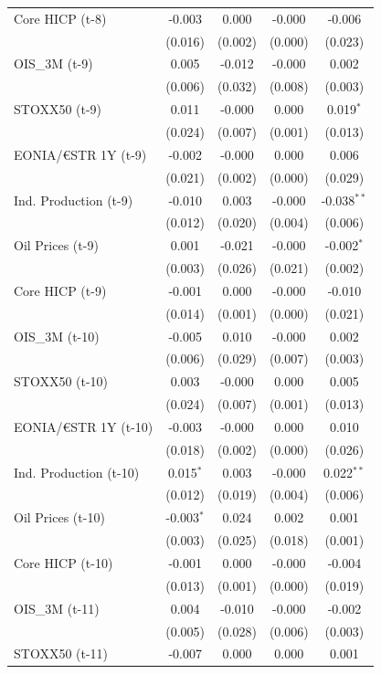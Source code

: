 \begin{longtable}[t]{lcccc}
Core HICP (t-8) & -0.003 & 0.000 & -0.000 & -0.006\\
 & (0.016) & (0.002) & (0.000) & (0.023)\\
OIS\_3M (t-9) & 0.005 & -0.012 & -0.000 & 0.002\\
 & (0.006) & (0.032) & (0.008) & (0.003)\\
STOXX50 (t-9) & 0.011 & -0.000 & 0.000 & 0.019$^{*}$\\
 & (0.024) & (0.007) & (0.001) & \vphantom{1} (0.013)\\
EONIA/€STR 1Y (t-9) & -0.002 & -0.000 & 0.000 & 0.006\\
 & (0.021) & (0.002) & (0.000) & (0.029)\\
Ind. Production (t-9) & -0.010 & 0.003 & -0.000 & -0.038$^{**}$\\
 & (0.012) & (0.020) & (0.004) & (0.006)\\
Oil Prices (t-9) & 0.001 & -0.021 & -0.000 & -0.002$^{*}$\\
 & (0.003) & (0.026) & (0.021) & (0.002)\\
Core HICP (t-9) & -0.001 & 0.000 & -0.000 & -0.010\\
 & (0.014) & (0.001) & (0.000) & (0.021)\\
OIS\_3M (t-10) & -0.005 & 0.010 & -0.000 & 0.002\\
 & (0.006) & (0.029) & (0.007) & (0.003)\\
STOXX50 (t-10) & 0.003 & -0.000 & 0.000 & 0.005\\
 & (0.024) & (0.007) & (0.001) & (0.013)\\
EONIA/€STR 1Y (t-10) & -0.003 & -0.000 & 0.000 & 0.010\\
 & (0.018) & (0.002) & (0.000) & (0.026)\\
Ind. Production (t-10) & 0.015$^{*}$ & 0.003 & -0.000 & 0.022$^{**}$\\
 & (0.012) & (0.019) & (0.004) & (0.006)\\
Oil Prices (t-10) & -0.003$^{*}$ & 0.024 & 0.002 & 0.001\\
 & (0.003) & (0.025) & (0.018) & (0.001)\\
Core HICP (t-10) & -0.001 & 0.000 & -0.000 & -0.004\\
 & (0.013) & (0.001) & (0.000) & (0.019)\\
OIS\_3M (t-11) & 0.004 & -0.010 & -0.000 & -0.002\\
 & (0.005) & (0.028) & (0.006) & (0.003)\\
STOXX50 (t-11) & -0.007 & 0.000 & 0.000 & 0.001\\

\end{longtable}
